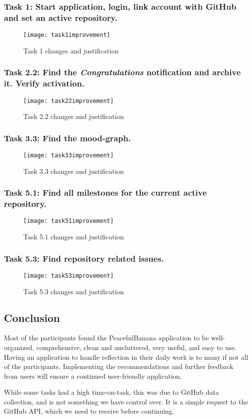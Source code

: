 \subsubsection*{Task 1: Start application, login, link account with GitHub and set an active repository. } 
\begin{figure}[h!]
    \centering
        \texttt{[image: task1improvement]}
    \caption{Task 1 changes and justification}
    \label{task1improvement}
\end{figure}
\subsubsection*{Task 2.2: Find the \emph{Congratulations} notification and archive it. Verify activation.}
\begin{figure}[H]
    \centering
        \texttt{[image: task22improvement]}
    \caption{Task 2.2 changes and justification}
    \label{task22improvement}
\end{figure}
\subsubsection*{Task 3.3: Find the mood-graph.} 
\begin{figure}[h!]
    \centering
        \texttt{[image: task33improvement]}
    \caption{Task 3.3 changes and justification}
    \label{task33improvement}
\end{figure}
\subsubsection*{Task 5.1: Find all milestones for the current active repository.}
\begin{figure}[h!]
    \centering
        \texttt{[image: task51improvement]}
    \caption{Task 5.1 changes and justification}
    \label{task51improvement}
\end{figure}
\subsubsection*{Task 5.3: Find repository related issues.} 
\begin{figure}[H]
    \centering
        \texttt{[image: task53improvement]}
    \caption{Task 5.3 changes and justification}
    \label{task53improvement}
\end{figure}

\subsection{Conclusion}
Most of the participants found the PeacefulBanana application to be well-organized, comprehensive, clean and uncluttered, very useful, and easy to use. Having an application to handle reflection in their daily work is to many if not all of the participants. Implementing the recommendations and further feedback from users will ensure a continued user-friendly application.

While some tasks had a high time-on-task, this was due to GitHub data collection, and is not something we have control over. It is a simple request to the GitHub API, which we need to receive before continuing. 
